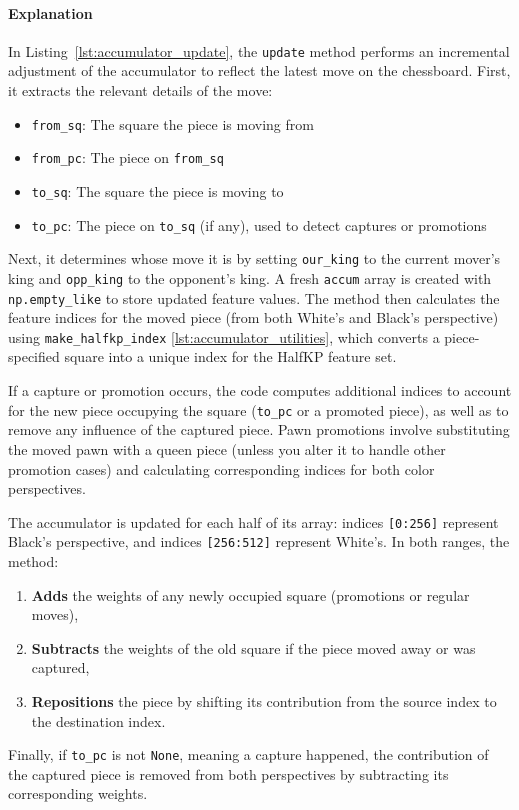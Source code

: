 \documentclass[12pt,a4paper]{article}
\begin{document}
\paragraph{Explanation} 
In Listing~\ref{lst:accumulator_update}, the \texttt{update} method performs an incremental adjustment of the accumulator to reflect the latest move on the chessboard. First, it extracts the relevant details of the move:
\begin{itemize}
  \item \texttt{from\_sq}: The square the piece is moving from
  \item \texttt{from\_pc}: The piece on \texttt{from\_sq}
  \item \texttt{to\_sq}: The square the piece is moving to
  \item \texttt{to\_pc}: The piece on \texttt{to\_sq} (if any), used to detect captures or promotions
\end{itemize}

Next, it determines whose move it is by setting \texttt{our\_king} to the current mover’s king and \texttt{opp\_king} to the opponent’s king. A fresh \texttt{accum} array is created with \texttt{np.empty\_like} to store updated feature values. The method then calculates the feature indices for the moved piece (from both White’s and Black’s perspective) using \texttt{make\_halfkp\_index} \ref{lst:accumulator_utilities}, which converts a piece-specified square into a unique index for the HalfKP feature set.

If a capture or promotion occurs, the code computes additional indices to account for the new piece occupying the square (\texttt{to\_pc} or a promoted piece), as well as to remove any influence of the captured piece. Pawn promotions involve substituting the moved pawn with a queen piece (unless you alter it to handle other promotion cases) and calculating corresponding indices for both color perspectives.

The accumulator is updated for each half of its array: indices \texttt{[0:256]} represent Black’s perspective, and indices \texttt{[256:512]} represent White’s. In both ranges, the method:
\begin{enumerate}
  \item \textbf{Adds} the weights of any newly occupied square (promotions or regular moves),
  \item \textbf{Subtracts} the weights of the old square if the piece moved away or was captured,
  \item \textbf{Repositions} the piece by shifting its contribution from the source index to the destination index.
\end{enumerate}
Finally, if \texttt{to\_pc} is not \texttt{None}, meaning a capture happened, the contribution of the captured piece is removed from both perspectives by subtracting its corresponding weights.
\end{document}
